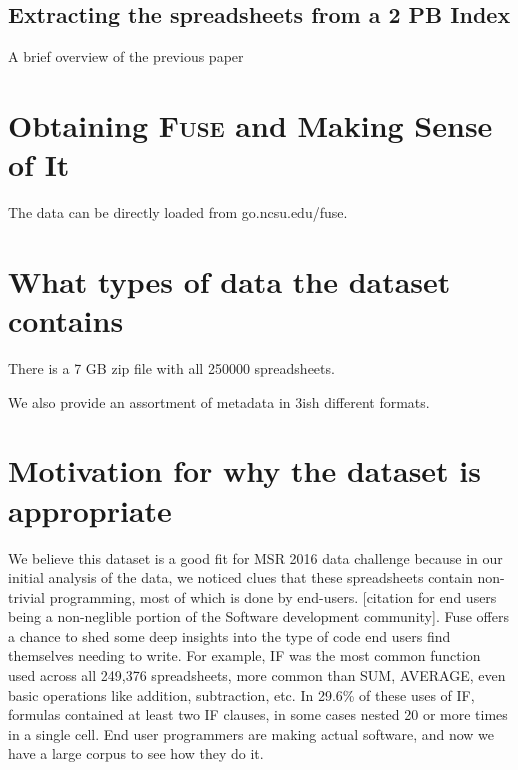 \documentclass[conference]{IEEEtran}
\newcommand{\xlscount}{249,376}
\begin{document}
\subsection{Extracting the spreadsheets from a 2 PB Index}

A brief overview of the previous paper


\section{Obtaining \textsc{Fuse} and Making Sense of It}

The data can be directly loaded from go.ncsu.edu/fuse.
\section{What types of data the dataset contains}
There is a 7 GB zip file with all 250000 spreadsheets.

We also provide an assortment of metadata in 3ish different formats.




\section{Motivation for why the dataset is appropriate}

We believe this dataset is a good fit for MSR 2016 data challenge because in our initial analysis of the data, we noticed clues that these spreadsheets contain non-trivial programming, most of which is done by end-users.
[citation for end users being a non-neglible portion of the Software development community].  
Fuse offers a chance to shed some deep insights into the type of code end users find themselves needing to write.
For example, IF was the most common function used across all \xlscount{} spreadsheets, more common than SUM, AVERAGE, even basic operations like addition, subtraction, etc.
In 29.6\% of these uses of IF, formulas contained at least two IF clauses, in some cases nested 20 or more times in a single cell.
End user programmers are making actual software, and now we have a large corpus to see how they do it.
\end{document}
